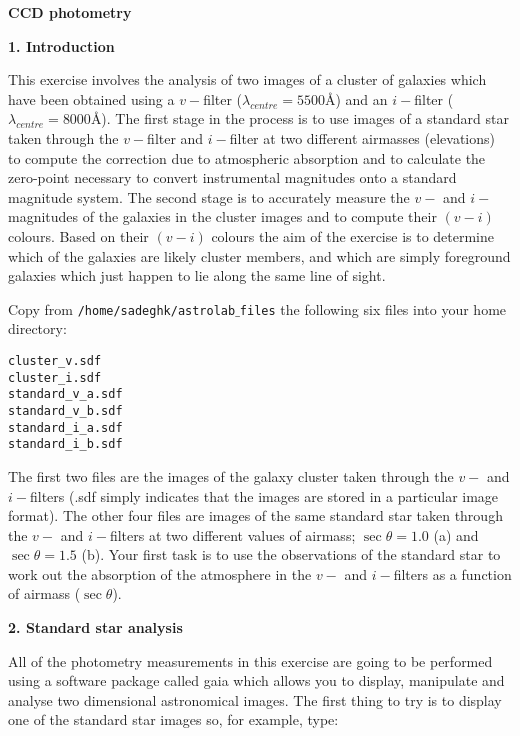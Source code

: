 \pagestyle{myheadings}
\setcounter{page}{1}

\begin{center}
{\Huge\bf CCD photometry}
\end{center}

{\bf \large{1. Introduction}}

This exercise involves the analysis of two images of a cluster of galaxies which have been obtained using a $v-$filter ($\lambda_{centre}=5500$\AA) and an $i-$filter ($\lambda_{centre}=8000$\AA). The first stage in the process is to use images of a standard star taken through the $v-$filter and $i-$filter at two different airmasses (elevations) to compute the correction due to atmospheric absorption and to calculate the zero-point necessary to convert instrumental magnitudes onto a standard magnitude system. The second stage is to accurately measure the $v-$ and $i-$magnitudes of the galaxies in the cluster images and to compute their $(v-i)$ colours. Based on their $(v-i)$ colours the aim of the exercise is to determine which of the galaxies are likely cluster members, and which are simply foreground galaxies which just happen to lie along the same line of sight.

\noindent
Copy from {\tt /home/sadeghk/astrolab$\_$files} the following six files into your home directory:

\verb,cluster_v.sdf,\\
\verb,cluster_i.sdf,\\
\verb,standard_v_a.sdf,\\
\verb,standard_v_b.sdf,\\
\verb,standard_i_a.sdf,\\
\verb,standard_i_b.sdf,

The first two files are the images of the galaxy cluster taken through the $v-$ and $i-$filters (.sdf simply indicates that the images are stored in a particular image format). The other four files are images of the same standard star taken through the $v-$ and $i-$filters at two different values of airmass; $\sec \theta=1.0$ (a) and $\sec \theta=1.5$ (b). Your first task is to use the observations of the standard star to work out the absorption of the atmosphere in the $v-$ and $i-$filters as a function of airmass ($\sec \theta$).

{\bf \large{2. Standard star analysis}}

All of the photometry measurements in this exercise are going to be performed using a software package called {\sc gaia} which allows you to display, manipulate and analyse two dimensional astronomical images. The first thing to try is to display one of the standard star images so, for example, type:


